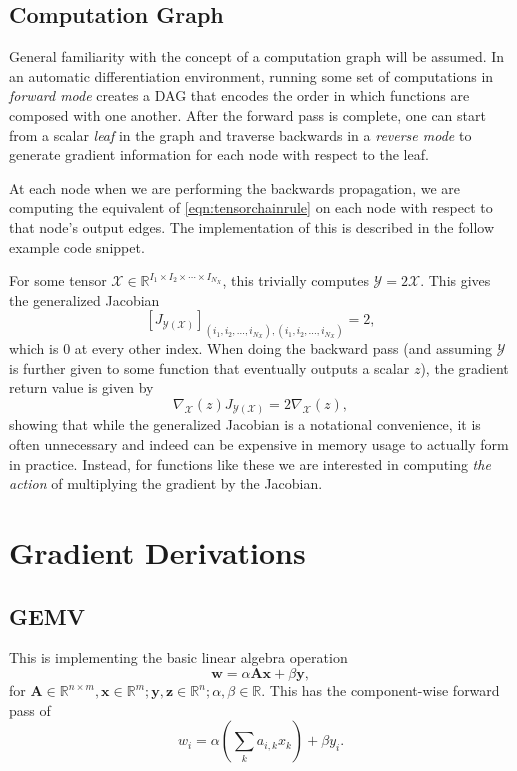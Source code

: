 \documentclass{article}
\newcommand{\mat}[1]{\bm{{#1}}}
\renewcommand{\vec}[1]{\bm{{#1}}}
\newcommand{\tensor}[1]{\bm{{\mathcal{#1}}}}
\newcommand{\gradfn}[2]{\nabla_{{#1}}\left({#2}\right)}
\theoremstyle{definition}
\begin{document}
\subsection{Computation Graph}
General familiarity with the concept of a computation graph\cite{pytorch,BaydinPR15} will be assumed.  In an automatic differentiation environment, running some set of computations in \textit{forward mode} creates a DAG that encodes the order in which functions are composed with one another.  After the forward pass is complete, one can start from a scalar \textit{leaf} in the graph and traverse backwards in a \textit{reverse mode} to generate gradient information for each node with respect to the leaf.

At each node when we are performing the backwards propagation, we are computing the equivalent of \cref{eqn:tensorchainrule} on each node with respect to that node's output edges.  The implementation of this is described in the follow example code snippet.



For some tensor $\tensor{X} \in \mathbb{R}^{I_1 \times I_2 \times \cdots \times I_{N_X}}$, this trivially computes $\tensor{Y}=2\tensor{X}$.  This gives the generalized Jacobian
\begin{equation}
  \left[J_{\tensor{Y}\left(\tensor{X}\right)}\right]_{\left(i_1, i_2, \ldots, i_{N_X}\right), \left(i_1, i_2, \ldots, i_{N_X}\right)} = 2,
\end{equation}
which is $0$ at every other index.  When doing the backward pass (and assuming $\tensor{Y}$ is further given to some function that eventually outputs a scalar $z$), the gradient return value is given by
\begin{equation}
 \gradfn{\tensor{X}}{z} J_{\tensor{Y}\left(\tensor{X}\right)} = 2\gradfn{\tensor{X}}{z},
\end{equation}
showing that while the generalized Jacobian is a notational convenience, it is often unnecessary and indeed can be expensive in memory usage to actually form in practice.  Instead, for functions like these we are interested in computing \textit{the action} of multiplying the gradient by the Jacobian.

\section{Gradient Derivations}
\subsection{GEMV}
This is implementing the basic linear algebra operation
\begin{equation}
  \vec{w} = \alpha \mat{A}\vec{x} + \beta \vec{y},
\end{equation}
for $\mat{A} \in \mathbb{R}^{n \times m}, \vec{x} \in \mathbb{R}^m; \vec{y}, \vec{z} \in \mathbb{R}^n; \alpha, \beta \in \mathbb{R}$.  This has the component-wise forward pass of
\begin{equation}
  w_i = \alpha\left(\sum_k a_{i,k} x_k\right) + \beta y_i.
\end{equation}
\end{document}
